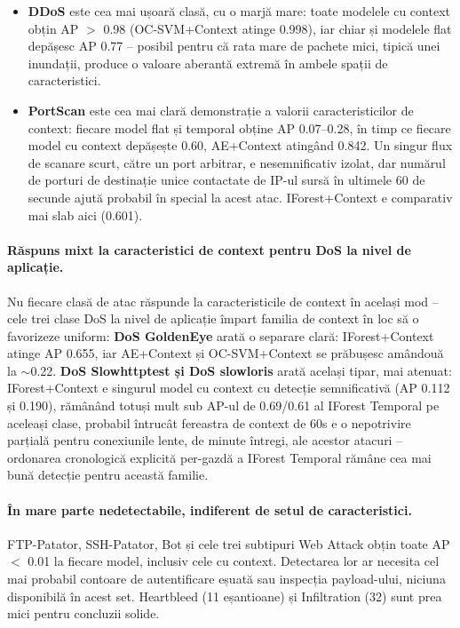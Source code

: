 \begin{itemize}
  \item \textbf{DDoS} este cea mai ușoară clasă, cu o marjă mare: toate modelele cu context obțin AP $>$ 0.98 (OC-SVM+Context atinge 0.998), iar chiar și modelele flat depășesc AP 0.77 -- posibil pentru că rata mare de pachete mici, tipică unei inundații, produce o valoare aberantă extremă în ambele spații de caracteristici.
  \item \textbf{PortScan} este cea mai clară demonstrație a valorii caracteristicilor de context: fiecare model flat și temporal obține AP 0.07--0.28, în timp ce fiecare model cu context depășește 0.60, AE+Context atingând 0.842. Un singur flux de scanare scurt, către un port arbitrar, e nesemnificativ izolat, dar numărul de porturi de destinație unice contactate de IP-ul sursă în ultimele 60 de secunde ajută probabil în special la acest atac. IForest+Context e comparativ mai slab aici (0.601).
\end{itemize}

\paragraph{Răspuns mixt la caracteristici de context pentru DoS la nivel de aplicație.} Nu fiecare clasă de atac răspunde la caracteristicile de context în același mod -- cele trei clase DoS la nivel de aplicație împart familia de context în loc să o favorizeze uniform:
\textbf{DoS GoldenEye} arată o separare clară: IForest+Context atinge AP 0.655, iar AE+Context și OC-SVM+Context se prăbușesc amândouă la $\sim$0.22.
\textbf{DoS Slowhttptest și DoS slowloris} arată același tipar, mai atenuat: IForest+Context e singurul model cu context cu detecție semnificativă (AP 0.112 și 0.190), rămânând totuși mult sub AP-ul de 0.69/0.61 al IForest Temporal pe aceleași clase, probabil întrucât fereastra de context de 60s e o nepotrivire parțială pentru conexiunile lente, de minute întregi, ale acestor atacuri -- ordonarea cronologică explicită per-gazdă a IForest Temporal rămâne cea mai bună detecție pentru această familie.

\paragraph{În mare parte nedetectabile, indiferent de setul de caracteristici.} FTP-Patator, SSH-Patator, Bot și cele trei subtipuri Web Attack obțin toate AP $<$ 0.01 la fiecare model, inclusiv cele cu context. Detectarea lor ar necesita cel mai probabil contoare de autentificare eșuată sau inspecția payload-ului, niciuna disponibilă în acest set. Heartbleed (11 eșantioane) și Infiltration (32) sunt prea mici pentru concluzii solide.

